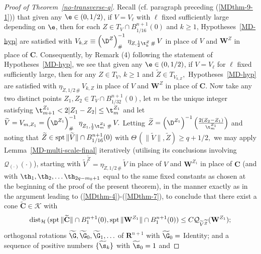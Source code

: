 \documentclass[a4paper,11pt]{amsart}
\begin{document}
\begin{proof}[Proof of Theorem~\ref{no-transverse-q}]
Recall (cf. paragraph preceding (\ref{MDthm-9-1})) that given any $\e \in (0, 1/2)$, if $V = V_{\ell}$ with $\ell$ fixed sufficiently large depending on $\e$, then for each $Z \in T_{V} \cap B_{1/16}^{n+1}(0)$ and $k \geq 1$, Hypotheses~\ref{MD-hyp} are satisfied with $V_{k, Z} \equiv \left(\D^{Z}\right)^{-1}_{\#} \, \eta_{Z, \frac{1}{2}\t_{k}^{Z} \, \#} \, V$ in place of $V$ and ${\mathbf W}^{Z}$ in place of ${\mathbf C}.$ Consequently, by Remark (4) following the statement of Hypotheses~\ref{MD-hyp}, we see that given any $\e \in (0, 1/2)$,  if $V = V_{\ell}$ for $\ell$ fixed sufficiently large, then for any $Z \in T_{V}$, $k \geq 1$ and $\widetilde{Z} \in T_{V_{k, Z}},$ Hypotheses~\ref{MD-hyp} are satisfied with $\eta_{\widetilde{Z}, 1/2 \, \#} \, V_{k, Z}$  in place of $V$ and ${\mathbf W}^{Z}$ in place of ${\mathbf C}.$ Now take any two distinct points $Z_{1}, Z_{2} \in T_{V} \cap B_{1/32}^{n+1}(0)$, let $m$ be the unique integer satisfying $\t_{m+1}^{Z_{1}} < 2|Z_{1} - Z_{2}| \leq \t_{m}^{Z_{1}}$ and let 
$\widetilde{V} = V_{m, Z_{1}} = \left(\D^{Z_{1}}\right)^{-1}_{\#} \, \eta_{Z_{1}, \frac{1}{2}\t_{m}^{Z_{1}} \, \#} \, V.$ Letting $\widetilde{Z} = \left(\D^{Z_{1}}\right)^{-1} \left(\frac{2(Z_{2} - Z_{1})}{\t_{m}^{Z_{1}}}\right)$ and noting that $\widetilde{Z} \in {\rm spt} \, \|\widetilde{V}\| \cap B_{1/16}^{n+1}(0)$ with $\Theta \, (\|\widetilde{V}\|, \widetilde{Z}) \geq q + 1/2,$ we may apply Lemma~\ref{MD-multi-scale-final} iteratively (utilising its conclusions involving ${\mathcal Q}_{(\cdot)}(\cdot)$), starting with $\widetilde{V}^{\widetilde{Z}} = \eta_{\widetilde{Z}, 1/2 \, \#} \, \widetilde{V}$ in place of $V$ and ${\mathbf W}^{Z_{1}}$ in place of ${\mathbf C}$ (and with $\th_{1}, \th_{2}, \ldots \th_{2q-m_{0}+1}$ equal to the same fixed constants as chosen at the beginning of the proof of the present theorem), in the manner exactly as in the argument leading to (\ref{MDthm-4})-(\ref{MDthm-7}), to conclude that there exist a cone $\widetilde{\mathbf C} \in {\mathcal K}$ with 
\begin{equation}\label{MDthm-11}
{\rm dist}_{\mathcal H} \, ({\rm spt} \, \|\widetilde{\mathbf C}\| \cap B_{1}^{n+1}(0), {\rm spt} \, \|{\mathbf W}^{Z_{1}}\| \cap B_{1}^{n+1}(0)) \leq C{\mathcal Q}_{\widetilde{V}^{\widetilde{Z}}}({\mathbf W}^{Z_{1}});
\end{equation}
orthogonal rotations $\widetilde{\G}, \widetilde{\G}_{0}, \widetilde{\G}_{1}, \ldots$ of ${\mathbf R}^{n+1}$ with $\widetilde{\G}_{0}=$ Identity; and a sequence of positive numbers $\{\widetilde{\s}_{k}\}$ with $\widetilde{\s}_{0}  = 1$ and  

\end{proof}
\end{document}
